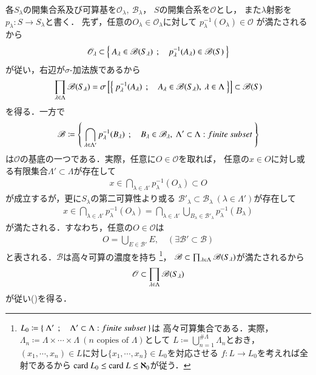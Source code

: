 \begin{prf}
	各$S_\lambda$の開集合系及び可算基を$\mathcal{O}_\lambda,\ \mathscr{B}_\lambda$，
	$S$の開集合系を$\mathscr{O}$とし，
	また$\lambda$射影を$p_\lambda:S \longrightarrow S_\lambda$と書く．
	先ず，任意の$O_\lambda \in \mathscr{O}_\lambda$に対して
	$p_\lambda^{-1}(O_\lambda) \in \mathscr{O}$
	が満たされるから
	\begin{align}
		\mathscr{O}_\lambda 
		\subset \left\{\ A_\lambda \in \mathscr{B}(S_\lambda)\ \, ; \quad p_\lambda^{-1}(A_\lambda) \in \mathscr{B}(S)\ \right\}
	\end{align}
	が従い，右辺が$\sigma$-加法族であるから
	\begin{align}
		\prod_{\lambda \in \Lambda} \mathscr{B}(S_\lambda)
		= \sigma \left[\left\{\ p_\lambda^{-1}(A_\lambda)\ \, ; \quad A_\lambda \in \mathscr{B}(S_\lambda),\ \lambda \in \Lambda\ \right\}\right] \subset \mathscr{B}(S)
	\end{align}
	を得る．一方で
	\begin{align}
		\mathscr{B} \coloneqq 
		\left\{\ \bigcap_{\lambda \in \Lambda'} p_\lambda^{-1}(B_\lambda)\ \, ; \quad B_\lambda \in \mathscr{B}_\lambda,\ \Lambda' \subset \Lambda:finite\ subset\ \right\}
	\end{align}
	は$\mathscr{O}$の基底の一つである．実際，任意に$O \in \mathscr{O}$を取れば，
	任意の$x \in O$に対し或る有限集合$\Lambda' \subset \Lambda$が存在して
	\begin{align}
		x \in \bigcap_{\lambda \in \Lambda'} p_\lambda^{-1} (O_\lambda) \subset O
	\end{align}
	が成立するが，更に$S_\lambda$の第二可算性より或る
	$\mathscr{B}'_\lambda \subset \mathscr{B}_\lambda\ (\lambda \in \Lambda')$が存在して
	\begin{align}
		x \in \bigcap_{\lambda \in \Lambda'} p_\lambda^{-1} (O_\lambda)
		= \bigcap_{\lambda \in \Lambda'} \bigcup_{B_{\lambda} \in \mathscr{B}'_\lambda} p_\lambda^{-1} (B_{\lambda})
	\end{align}
	が満たされる．すなわち，任意の$O \in \mathscr{O}$は
	\begin{align}
		O = \bigcup_{E \in \mathscr{B}'} E,
		\quad (\exists\mathscr{B}' \subset \mathscr{B})
	\end{align}
	と表される．$\mathscr{B}$は高々可算の濃度を持ち
	\footnote{
		$L_0 \coloneqq 
		\Set{\Lambda'}{\Lambda' \subset \Lambda:finite\ subset}$は
		高々可算集合である．実際，$\Lambda_n \coloneqq \Lambda \times \cdots \times \Lambda\ 
		(\mbox{$n$ copies of $\Lambda$})$として
		$L \coloneqq \bigcup_{n=1}^{\# \Lambda} \Lambda_n$とおき，
		$(x_1,\cdots,x_n) \in L$に対し$\{x_1,\cdots,x_n\} \in L_0$を対応させる
		$f:L \longrightarrow L_0$を考えれば全射であるから
		$\mathrm{card}\ L_0 \leq \mathrm{card}\ L \leq \aleph_0$が従う．
	}，
	$\mathscr{B} \subset \prod_{\lambda \in \Lambda} \mathscr{B}(S_\lambda)$が満たされるから
	\begin{align}
		\mathscr{O} \subset \prod_{\lambda \in \Lambda} \mathscr{B}(S_\lambda)
	\end{align}
	が従い()を得る．
	\QED
\end{prf}

